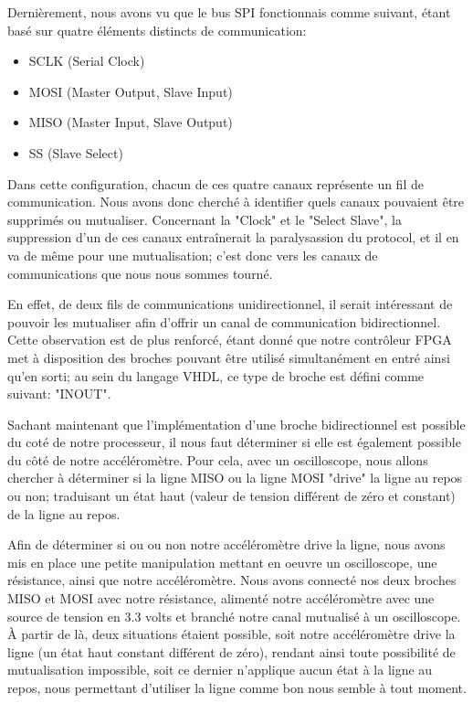 \documentclass[french,a4paper,12pt]{report}
\begin{document}
	Dernièrement, nous avons vu que le bus SPI fonctionnais comme suivant, étant basé sur quatre éléments distincts de communication:
	
	\begin{itemize}
		\item SCLK (Serial Clock) 
		\item MOSI (Master Output, Slave Input) 
		\item MISO (Master Input, Slave Output) 
		\item SS (Slave Select)
	\end{itemize}
	
	Dans cette configuration, chacun de ces quatre canaux représente un fil de communication. Nous avons donc cherché à identifier quels canaux pouvaient être supprimés ou mutualiser. Concernant la "Clock" et le "Select Slave", la suppression d'un de ces canaux entraînerait la paralysassion du protocol, et il en va de même pour une mutualisation; c'est donc vers les canaux de communications que nous nous sommes tourné.
	
	En effet, de deux fils de communications unidirectionnel, il serait intéressant de pouvoir les mutualiser afin d'offrir un canal de communication bidirectionnel. Cette observation est de plus renforcé, étant donné que notre contrôleur FPGA met à disposition des broches pouvant être utilisé simultanément en entré ainsi qu'en sorti; au sein du langage VHDL, ce type de broche est défini comme suivant: "INOUT".
	
	Sachant maintenant que l'implémentation d'une broche bidirectionnel est possible du coté de notre processeur, il nous faut déterminer si elle est également possible du côté de notre accéléromètre. Pour cela, avec un oscilloscope, nous allons chercher à déterminer si la ligne MISO ou la ligne MOSI "drive" la ligne au repos ou non; traduisant un état haut (valeur de tension différent de zéro et constant) de la ligne au repos.
	
	Afin de déterminer si ou ou non notre accéléromètre drive la ligne, nous avons mis en place une petite manipulation mettant en oeuvre un oscilloscope, une résistance, ainsi que notre accéléromètre. Nous avons connecté nos deux broches MISO et MOSI avec notre résistance, alimenté notre accéléromètre avec une source de tension en 3.3 volts et branché notre canal mutualisé à un oscilloscope. À partir de là, deux situations étaient possible, soit notre accéléromètre drive la ligne (un état haut constant différent de zéro), rendant ainsi toute possibilité de mutualisation impossible, soit ce dernier n'applique aucun état à la ligne au repos, nous permettant d'utiliser la ligne comme bon nous semble à tout moment.
	
\end{document}
